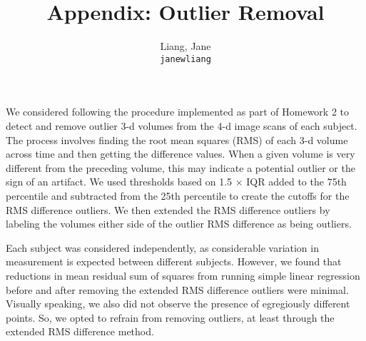 \documentclass[11pt]{article}
\title{Appendix: Outlier Removal}
\author{
  Liang, Jane\\
  \texttt{janewliang}
}
\begin{document}
\maketitle

We considered following the procedure implemented as part of Homework 2 to 
detect and remove outlier 3-d volumes from the 4-d image scans of each subject. 
The process involves finding the root mean squares (RMS) of each 3-d volume 
across time and then getting the difference values. When a given volume is very 
different from the preceding volume, this may indicate a potential outlier or 
the sign of an artifact. We used thresholds based on 1.5 $\times$ IQR added to 
the 75th percentile and subtracted from the 25th percentile to create the 
cutoffs for the RMS difference outliers. We then extended the RMS difference 
outliers by labeling the volumes either side of the outlier RMS difference as 
being outliers. 

Each subject was considered independently, as considerable variation in 
measurement is expected between different subjects. However, we found that 
reductions in mean residual sum of squares from running simple linear regression 
before and after removing the extended RMS difference outliers were minimal. 
Visually speaking, we also did not observe the presence of egregiously different 
points. So, we opted to refrain from removing outliers, at least through the 
extended RMS difference method. 


\end{document}
